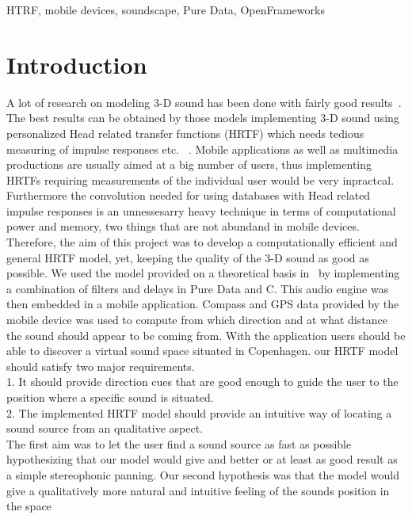 \documentclass[journal]{IEEEtran}
\begin{document}
\begin{IEEEkeywords}
HTRF, mobile devices, soundscape, Pure Data, OpenFrameworks
\end{IEEEkeywords}



\section{Introduction}

A lot of research on modeling 3-D sound has been done with fairly good results~\cite{begault19943}. The best results can be obtained by those models implementing 3-D sound using personalized Head related transfer functions (HRTF) which needs tedious measuring of impulse responses etc. ~\cite{Meshram2014}. Mobile applications as well as multimedia productions are usually aimed at a big number of users, thus implementing HRTFs requiring measurements of the individual user would be very inpractcal. Furthermore the convolution needed for using databases with Head related impulse responses is an unnessesarry heavy technique in terms of computational power and memory, two things that are not abundand in mobile devices. Therefore, the aim of this project was to develop a computationally efficient and general HRTF model, yet, keeping the quality of the 3-D sound as good as possible. We used the model provided on a theoretical basis in~\cite{Brown1997} by implementing a combination of filters and delays in Pure Data and C. This audio engine was then embedded in a mobile application. Compass and GPS data provided by the mobile device was used to compute from which direction and at what distance the sound should appear to be coming from. With the application users should be able to discover a virtual sound space situated in Copenhagen. our HRTF model should satisfy two major requirements. 
\\1. It should provide direction cues that are good enough to guide the user to the position where a specific sound is situated.\\2. The implemented HRTF model should provide an intuitive way of locating a sound source from an qualitative aspect. \\The first aim was to let the user find a sound source as fast as possible hypothesizing that our model would give and better or at least as good result as a simple stereophonic panning. Our second hypothesis was that the model would give a qualitatively more natural and intuitive feeling of the sounds position in the space
\end{document}
